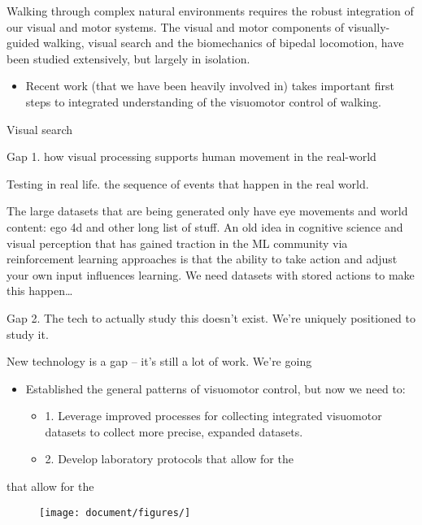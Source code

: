 Walking through complex natural environments requires the robust
integration of our visual and motor systems. The visual and motor
components of visually-guided walking, visual search and the
biomechanics of bipedal locomotion, have been studied extensively, but
largely in isolation.

\begin{itemize}
\item
  Recent work (that we have been heavily involved in) takes important
  first steps to integrated understanding of the visuomotor control of
  walking.
\end{itemize}

Visual search

Gap 1. how visual processing supports human movement in the real-world

Testing in real life. the sequence of events that happen in the real
world.

The large datasets that are being generated only have eye movements and
world content: ego 4d and other long list of stuff. An old idea in
cognitive science and visual perception that has gained traction in the
ML community via reinforcement learning approaches is that the ability
to take action and adjust your own input influences learning. We need
datasets with stored actions to make this happen\ldots{}

Gap 2. The tech to actually study this doesn't exist. We're uniquely
positioned to study it.

New technology is a gap -- it's still a lot of work. We're going

\begin{itemize}
\item
  Established the general patterns of visuomotor control, but now we
  need to:

  \begin{itemize}
  \item
    1. Leverage improved processes for collecting integrated visuomotor
    datasets to collect more precise, expanded datasets.
  \item
    2. Develop laboratory protocols that allow for the
  \end{itemize}
\end{itemize}
that allow for the

\begin{figure}[h]
\centering
\texttt{[image: document/figures/]}
\caption{}
\end{figure}